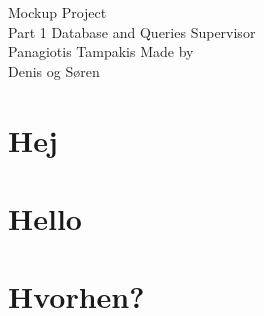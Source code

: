 \documentclass{article}
\begin{document}
\begin{titlepage}
    \vfill
    \clearpage\thispagestyle{empty}
    \centering
    {\Large Mockup Project }\vspace{0.5cm} \\
    {Part 1 Database and Queries}
    \vfill
    {Supervisor}\\
    {Panagiotis Tampakis}
    \vfill
    {Made by}\\
    {Denis og Søren\\}
    \vskip6cm
\end{titlepage}

\section*{Hej}
\section*{Hello}

\newpage
\section*{Hvorhen?}

\clearpage
\tableofcontents
\newpage


\newpage


\section{}

\newpage


\newpage

\end{document}

